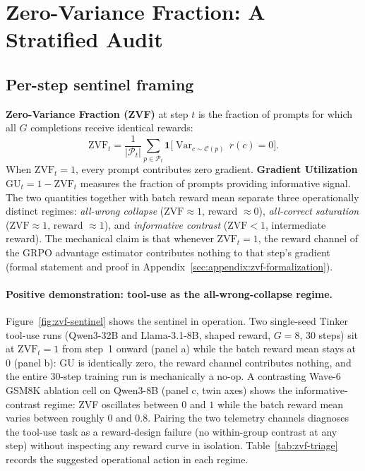 \documentclass{article}
\begin{document}
\section{Zero-Variance Fraction: A Stratified Audit}
\label{sec:results}


\subsection{Per-step sentinel framing}
\label{sec:zvf-sentinel}


\textbf{Zero-Variance Fraction (ZVF)} at step $t$ is the fraction of prompts
for which all $G$ completions receive identical rewards:
\[
  \mathrm{ZVF}_t = \frac{1}{|\mathcal{P}_t|}\sum_{p \in \mathcal{P}_t}
  \mathbf{1}\bigl[\operatorname{Var}_{c \sim \mathcal{C}(p)}\,r(c) = 0\bigr].
\]
When $\mathrm{ZVF}_t = 1$, every prompt contributes zero gradient.
\textbf{Gradient Utilization} $\mathrm{GU}_t = 1 - \mathrm{ZVF}_t$ measures
the fraction of prompts providing informative signal. The two quantities
together with batch reward mean separate three operationally distinct
regimes: \emph{all-wrong collapse} ($\mathrm{ZVF}{\approx}1$, reward $\approx
0$), \emph{all-correct saturation} ($\mathrm{ZVF}{\approx}1$, reward $\approx
1$), and \emph{informative contrast} ($\mathrm{ZVF}{<}1$, intermediate
reward). The mechanical claim is that whenever
$\mathrm{ZVF}_t = 1$, the reward channel of the GRPO advantage estimator
contributes nothing to that step's gradient
(formal statement and proof in
Appendix~\ref{sec:appendix:zvf-formalization}).

\paragraph{Positive demonstration: tool-use as the all-wrong-collapse regime.}
Figure~\ref{fig:zvf-sentinel} shows the sentinel in operation. Two
single-seed Tinker tool-use runs (Qwen3-32B and Llama-3.1-8B,
shaped reward, $G{=}8$, 30 steps) sit at $\mathrm{ZVF}_t = 1$
from step~1 onward (panel a) while the batch reward mean stays at $0$
(panel b): GU is identically zero, the reward channel contributes
nothing, and the entire 30-step training run is mechanically a no-op.
A contrasting Wave-6 GSM8K ablation cell on Qwen3-8B (panel c, twin axes)
shows the informative-contrast regime: ZVF oscillates between $0$ and $1$
while the batch reward mean varies between roughly $0$ and $0.8$. Pairing
the two telemetry channels diagnoses the tool-use task as a reward-design
failure (no within-group contrast at any step) without inspecting any
reward curve in isolation. Table~\ref{tab:zvf-triage} records the suggested
operational action in each regime.
\end{document}

